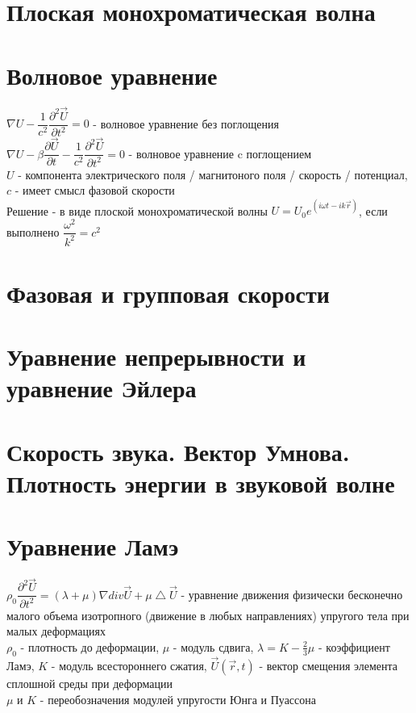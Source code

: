\newcommand{\colontitulAutors}{astronom\_v\_cube}
\newcommand{\colontitulYear}{2023~}
\newcommand{\colontitulEducationalSubject}{Физика волновых процессов}
\newcommand{\colontitulTeacher}{Петров Е. Ю.}




	\small
	\begin{multicols*}{2}
		\section{Плоская монохроматическая волна}

		\section{Волновое уравнение}
		$\nabla U - \dfrac{1}{c^2} \dfrac{\partial^2 \vec{U}}{\partial t^2} = 0$ - волновое уравнение без поглощения\\
		$\nabla U - \beta\dfrac{\partial\vec{U}}{\partial t} -\dfrac{1}{c^2} \dfrac{\partial^2 \vec{U}}{\partial t^2} = 0$ - волновое уравнение c поглощением\\
		$U$ - компонента электрического поля / магнитоного поля / скорость / потенциал, $c$ - имеет смысл фазовой скорости\\
		Решение - в виде плоской монохроматической волны $U = U_0 e^{(i\omega t- i k \vec{r})}$, если выполнено $\dfrac{\omega^2}{k^2} = c^2$

		\section{Фазовая и групповая скорости}

		\section{Уравнение непрерывности и уравнение Эйлера}

		\section{Скорость звука. Вектор Умнова. Плотность энергии в звуковой волне}

		\section{Уравнение Ламэ}
		$\rho_0 \dfrac{\partial^2 \vec{U}}{\partial t^2} = (\lambda + \mu) \nabla div \vec{U} + \mu \bigtriangleup  \vec{U}$ - уравнение движения физически бесконечно малого объема изотропного (движение в любых направлениях) упругого тела при малых деформациях\\
		$\rho_0$ - плотность до деформации, $\mu$ - модуль сдвига, $\lambda = K - \frac{2}{3}\mu$ - коэффициент Ламэ, $K$ - модуль всестороннего сжатия, $\vec{U}(\vec{r}, t)$ - вектор смещения элемента сплошной среды при деформации\\
		$\mu$ и $K$ - переобозначения модулей упругости Юнга и Пуассона


\end{multicols*}
